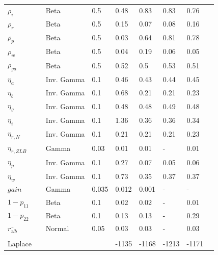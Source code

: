 \documentclass[12pt,reqno]{article}
\numberwithin{equation}{section}
\begin{document}
\begin{table}[H]
\begin{tabular}{llll|ll|lll}
$\rho_i$ &  & Beta & 0.5 			& 0.48 & 0.83 & 0.83 & 0.76 \\
$\rho_r$ &  & Beta & 0.5 			& 0.15 & 0.07 & 0.08 & 0.16 \\
$\rho_p$ &  & Beta & 0.5 			& 0.03 & 0.64 & 0.81 & 0.78 \\
$\rho_w$ &  & Beta & 0.5 			& 0.04 & 0.19 & 0.06 & 0.05 \\
$\rho_{ga}$ &  & Beta & 0.5 		& 0.52 & 0.5 & 0.53 & 0.51 \\
$\eta_a$ &  & Inv. Gamma & 0.1 		& 0.46 & 0.43 & 0.44 & 0.45 \\
$\eta_b$ &  & Inv. Gamma & 0.1 		& 0.68 & 0.21 & 0.21 & 0.23 \\
$\eta_g$ &  & Inv. Gamma & 0.1 		& 0.48 & 0.48 & 0.49 & 0.48 \\
$\eta_i$ &  & Inv. Gamma & 0.1 		& 1.36 & 0.36 & 0.36 & 0.34 \\
$\eta_{r,N}$ &  & Inv. Gamma & 0.1 	& 0.21 & 0.21 & 0.21 & 0.23 \\
$\eta_{r,ZLB}$ &  & Gamma & 0.03 	& 0.01 & 0.01 & - & 0.01 \\
$\eta_p$ &  & Inv. Gamma & 0.1 		& 0.27 & 0.07 & 0.05 & 0.06 \\
$\eta_w$ &  & Inv. Gamma & 0.1 		& 0.73 & 0.35 & 0.37 & 0.37 \\
$gain$ &  & Gamma & 0.035 			& 0.012 & 0.001 & - &  -\\
$1-p_{11}$ &  & Beta & 0.1 			& 0.02 & 0.02 & - & 0.01 \\
$1-p_{22}$ &  & Beta & 0.1 			& 0.13 & 0.13 & - & 0.29 \\
$\bar{r_{zlb}}$ &  & Normal & 0.05 	& 0.03 & 0.03 & - & 0.03 \\
 &  &  &  &  &  &  &  \\
Laplace &  &  &  & -1135 & -1168 & -1213 & -1171
\end{tabular}
\end{table}
\end{document}
